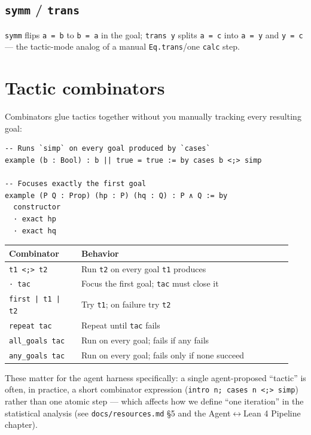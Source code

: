 \subsection{\texttt{symm} / \texttt{trans}}

\texttt{symm} flips \texttt{a = b} to \texttt{b = a} in the goal; \texttt{trans y} splits \texttt{a = c} into \texttt{a = y} and \texttt{y = c} --- the tactic-mode analog of a manual \texttt{Eq.trans}/one \texttt{calc} step.

\section{Tactic combinators}

Combinators glue tactics together without you manually tracking every resulting goal:

\begin{verbatim}
-- Runs `simp` on every goal produced by `cases`
example (b : Bool) : b || true = true := by cases b <;> simp

-- Focuses exactly the first goal
example (P Q : Prop) (hp : P) (hq : Q) : P ∧ Q := by
  constructor
  · exact hp
  · exact hq
\end{verbatim}

\begin{center}
\begin{tabular}{@{}p{0.24\linewidth}p{0.70\linewidth}@{}}
\hline
\textbf{Combinator} & \textbf{Behavior} \\
\hline
\texttt{t1 <;> t2} & Run \texttt{t2} on every goal \texttt{t1} produces \\
\texttt{· tac} & Focus the first goal; \texttt{tac} must close it \\
\texttt{first | t1 | t2} & Try \texttt{t1}; on failure try \texttt{t2} \\
\texttt{repeat tac} & Repeat until \texttt{tac} fails \\
\texttt{all\_goals tac} & Run on every goal; fails if any fails \\
\texttt{any\_goals tac} & Run on every goal; fails only if none succeed \\
\hline
\end{tabular}
\end{center}

These matter for the agent harness specifically: a single agent-proposed ``tactic'' is often, in practice, a short combinator expression (\texttt{intro n; cases n <;> simp}) rather than one atomic step --- which affects how we define ``one iteration'' in the statistical analysis (see \texttt{docs/resources.md} \S5 and the Agent\(\leftrightarrow\)Lean 4 Pipeline chapter).

